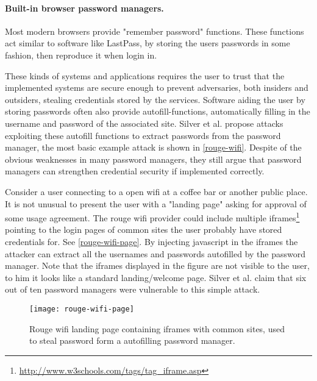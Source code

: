 \paragraph{Built-in browser password managers.} Most modern browsers provide "remember password" functions. These functions act similar to software like LastPass, by storing the users passwords in some fashion, then reproduce it when login in. 

These kinds of systems and applications requires the user to trust that the implemented systems are secure enough to prevent adversaries, both insiders and outsiders, stealing credentials stored by the services. Software aiding the user by storing passwords often also provide autofill-functions, automatically filling in the username and password of the associated site. Silver et al. \cite{pw-managment-attacks} propose attacks exploiting these autofill functions to extract passwords from the password manager, the most basic example attack is shown in \autoref{rouge-wifi}. Despite of the obvious weaknesses in many password managers, they still argue that password managers can strengthen credential security if implemented correctly.  
\begin{example}\label{rouge-wifi}
    Consider a user connecting to a open wifi at a coffee bar or another public place. It is not unusual to present the user with a "landing page" asking for approval of some usage agreement. The rouge wifi provider could include multiple iframes\footnote{\url{http://www.w3schools.com/tags/tag_iframe.asp}} pointing to the login pages of common sites the user probably have stored credentials for. See \autoref{rouge-wifi-page}. By injecting javascript in the iframes the attacker can extract all the usernames and passwords autofilled by the password manager. Note that the iframes displayed in the figure are not visible to the user, to him it looks like a standard landing/welcome page. Silver et al. \cite{pw-managment-attacks} claim that six out of ten password managers were vulnerable to this simple attack.


\begin{figure}
    \texttt{[image: rouge-wifi-page]}
    \caption{Rouge wifi landing page containing iframes with common sites, used to steal password form a autofilling password manager.} 
    \label{rouge-wifi-page}
\end{figure}

\end{example}


